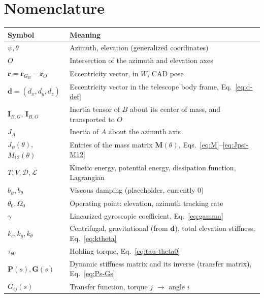 \documentclass[11pt,a4paper]{article}
\numberwithin{equation}{section}
\newcommand{\bs}[1]{\boldsymbol{#1}}
\begin{document}
\section*{Nomenclature}

\begin{center}
\begin{tabular}{@{}p{}p{}@{}}
\toprule
Symbol & Meaning \\
\midrule
$\psi,\theta$ & Azimuth, elevation (generalized coordinates) \\
$O$ & Intersection of the azimuth and elevation axes \\
$\bs r=\bs r_{G_B}-\bs r_O$ & Eccentricity vector, in $W$, CAD pose \\
$\bs d=(d_x,d_y,d_z)$ & Eccentricity vector in the telescope body frame, Eq.~\eqref{eq:d-def} \\
$\bs I_{B,G}$, $\bs I_{B,O}$ & Inertia tensor of $B$ about its center of mass, and transported to $O$ \\
$J_A$ & Inertia of $A$ about the azimuth axis \\
$J_\psi(\theta)$, $M_{12}(\theta)$ & Entries of the mass matrix $\bs M(\theta)$, Eqs.~\eqref{eq:M}--\eqref{eq:Jpsi-M12} \\
$T,V,\mathcal D,\mathcal L$ & Kinetic energy, potential energy, dissipation function, Lagrangian \\
$b_\psi,b_\theta$ & Viscous damping (placeholder, currently $0$) \\
$\theta_0,\Omega_0$ & Operating point: elevation, azimuth tracking rate \\
$\gamma$ & Linearized gyroscopic coefficient, Eq.~\eqref{eq:gamma} \\
$k_c,k_g,k_\theta$ & Centrifugal, gravitational (from $\bs d$), total elevation stiffness, Eq.~\eqref{eq:ktheta} \\
$\tau_{\theta0}$ & Holding torque, Eq.~\eqref{eq:tau-theta0} \\
$\bs P(s),\bs G(s)$ & Dynamic stiffness matrix and its inverse (transfer matrix), Eq.~\eqref{eq:Ps-Gs} \\
$G_{ij}(s)$ & Transfer function, torque $j$ $\to$ angle $i$ \\
\bottomrule
\end{tabular}
\end{center}
\end{document}
